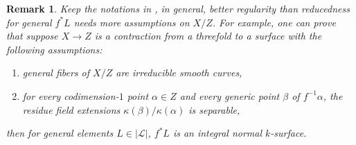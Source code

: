 \documentclass[letterpaper,reqno,12pt]{amsart}
\DeclareMathOperator{\Spec}{Spec}
\numberwithin{equation}{section}
\theoremstyle{plain}
\newtheorem{remark}{Remark}[section]
\begin{document}
\begin{remark}%
    Keep the notations in , in general, better regularity than reducedness for general $f^*L$ needs more assumptions on $X/Z$. For example, one can prove that suppose $X\to Z$ is a contraction from a threefold to a surface with the following assumptions:
    \begin{enumerate}
        \item general fibers of $X/Z$ are irreducible smooth curves,
        \item for every codimension-$1$ point $\alpha\in Z$ and every generic point $\beta$ of $f^{-1}\alpha$, the residue field extensions  $\kappa(\beta)/\kappa(\alpha)$ is separable,
    \end{enumerate} 
    then for general elements $L\in |\mathscr L|$, $f^*L$ is an integral normal $k$-surface.
    
    

\end{remark}
\end{document}
